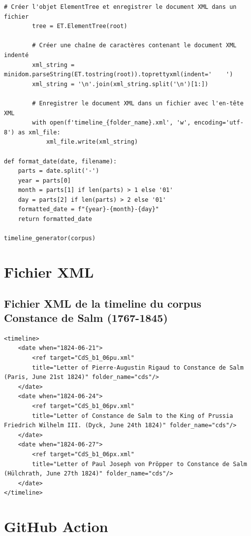 \begin{lstlisting}[style=pythonStyle, caption=script python pour générer les timeline.xml]
        # Créer l'objet ElementTree et enregistrer le document XML dans un fichier
        tree = ET.ElementTree(root)

        # Créer une chaîne de caractères contenant le document XML indenté
        xml_string = minidom.parseString(ET.tostring(root)).toprettyxml(indent='    ')
        xml_string = '\n'.join(xml_string.split('\n')[1:])

        # Enregistrer le document XML dans un fichier avec l'en-tête XML
        with open(f'timeline_{folder_name}.xml', 'w', encoding='utf-8') as xml_file:
            xml_file.write(xml_string)

def format_date(date, filename):
    parts = date.split('-')
    year = parts[0]
    month = parts[1] if len(parts) > 1 else '01'
    day = parts[2] if len(parts) > 2 else '01'
    formatted_date = f"{year}-{month}-{day}"
    return formatted_date

timeline_generator(corpus)

\end{lstlisting}

\newpage

\chapter{Fichier XML}

\section{Fichier XML de la timeline du corpus \og{}Constance de Salm (1767-1845)\fg{}}
\label{xml_file_timeline}
\begin{lstlisting}[style=XMLStyle, caption=Fichier XML de la timeline]
<timeline>
    <date when="1824-06-21">
        <ref target="CdS_b1_06pu.xml" 
        title="Letter of Pierre-Augustin Rigaud to Constance de Salm (Paris, June 21st 1824)" folder_name="cds"/>
    </date>
    <date when="1824-06-24">
        <ref target="CdS_b1_06pv.xml" 
        title="Letter of Constance de Salm to the King of Prussia Friedrich Wilhelm III. (Dyck, June 24th 1824)" folder_name="cds"/>
    </date>
    <date when="1824-06-27">
        <ref target="CdS_b1_06px.xml" 
        title="Letter of Paul Joseph von Pröpper to Constance de Salm (Hülchrath, June 27th 1824)" folder_name="cds"/>
    </date>
</timeline>
\end{lstlisting}

\newpage

\chapter{GitHub Action}

